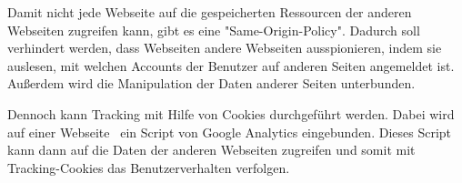 Damit nicht jede Webseite auf die gespeicherten Ressourcen der anderen Webseiten zugreifen kann, gibt es eine "Same-Origin-Policy".
Dadurch soll verhindert werden, dass Webseiten andere Webseiten ausspionieren, indem sie auslesen, mit welchen Accounts der Benutzer auf anderen Seiten angemeldet ist. Außerdem wird die Manipulation der Daten anderer Seiten unterbunden. \cite{MDNSame-origin-policy}

Dennoch kann Tracking mit Hilfe von Cookies durchgeführt werden.
Dabei wird auf einer Webseite \zb\ ein Script von Google Analytics eingebunden. 
Dieses Script kann dann auf die Daten der anderen Webseiten zugreifen und somit mit Tracking-Cookies das Benutzer\-verhalten verfolgen. \cite{TrackingCookies}







\clearpage

\clearpage

